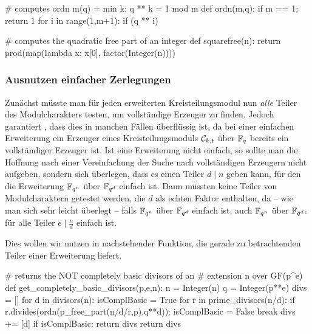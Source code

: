 \begin{sagecode}[caption={Aus \url{../Sage/enumeratePCNs.spyx}},
  firstnumber=538]
# computes ordn m(q) = min{ k: q ** k = 1 mod m }
def ordn(m,q):
    if m == 1: return 1
    for i in range(1,m+1):
        if (q ** i)%
\end{sagecode}  

\begin{sagecode}[caption={Aus \url{../Sage/enumeratePCNs.spyx}},
  firstnumber=534]
# computes the quadratic free part of an integer
def squarefree(n):
    return prod(map(lambda x: x[0], factor(Integer(n))))
\end{sagecode}  


\subsubsection{Ausnutzen einfacher Zerlegungen}

Zunächst müsste man für jeden erweiterten Kreisteilungsmodul
nun \emph{alle} Teiler des Modulcharakters testen, um vollständige Erzeuger zu
finden. Jedoch garantiert , dass dies in
manchen Fällen überflüssig ist, da bei einer einfachen Erweiterung ein Erzeuger
eines Kreisteilungsmoduls $\mathcal{C}_{k,t}$ über $\mathbb{F}_q$ bereits ein vollständiger
Erzeuger ist. Ist eine Erweiterung nicht einfach, so sollte man die Hoffnung
nach einer Vereinfachung der Suche nach vollständigen Erzeugern nicht aufgeben,
sondern sich überlegen, dass es einen Teiler $d \mid n$ geben kann, für den
die Erweiterung $\mathbb{F}_{q^n}$ über $\mathbb{F}_{q^d}$ einfach ist. Dann müssten keine
Teiler von Modulcharaktern getestet werden, die $d$ als echten Faktor
enthalten, da -- wie man sich sehr leicht überlegt -- 
falls $\mathbb{F}_{q^n}$ über $\mathbb{F}_{q^d}$ einfach
ist, auch $\mathbb{F}_{q^n}$ über $\mathbb{F}_{q^{d\,e}}$ für alle
Teiler $e \mid \tfrac n d$ einfach ist.

Dies wollen wir nutzen in nachstehender Funktion, die
gerade zu betrachtenden Teiler einer Erweiterung liefert.

\begin{sagecode}[caption={Aus \url{../Sage/enumeratePCNs.spyx}},
  firstnumber=594, label=lst:get_completely_basic_divisors]
# returns the NOT completely basic divisors of an 
# extension n over GF(p^e)
def get_completely_basic_divisors(p,e,n):
    n = Integer(n)
    q = Integer(p**e)
    divs = []
    for d in divisors(n):
        isComplBasic = True
        for r in prime_divisors(n/d):
            if r.divides(ordn(p_free_part(n/d/r,p),q**d)):
                isComplBasic = False
                break
        divs += [d]
        if isComplBasic: return divs
    return divs
\end{sagecode}

